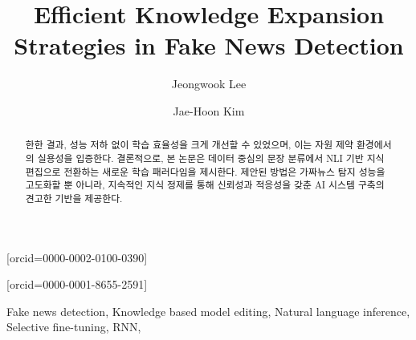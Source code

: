\documentclass[a4paper,fleqn]{cas-sc}
\begin{document}
\let\WriteBookmarks\relax


\def\floatpagepagefraction{1}
\def\textpagefraction{.001}



\title [mode = title]{Efficient Knowledge Expansion Strategies in Fake News Detection}

\author[1]{Jeongwook Lee}[orcid=0000-0002-0100-0390]

\author[1]{Jae-Hoon Kim}[orcid=0000-0001-8655-2591]
\cormark[1]




\begin{abstract}한한 결과, 성능 저하 없이 학습 효율성을 크게 개선할 수 있었으며, 이는 자원 제약 환경에서의 실용성을 입증한다. 결론적으로, 본 논문은 데이터 중심의 문장 분류에서 NLI 기반 지식 편집으로 전환하는 새로운 학습 패러다임을 제시한다. 제안된 방법은 가짜뉴스 탐지 성능을 고도화할 뿐 아니라, 지속적인 지식 정제를 통해 신뢰성과 적응성을 갖춘 AI 시스템 구축의 견고한 기반을 제공한다. 
\end{abstract}



\begin{keywords}
 Fake news detection\sep
 Knowledge based model editing\sep
 Natural language inference\sep
 Selective fine-tuning\sep
 RNN\sep
\end{keywords}
\end{document}
